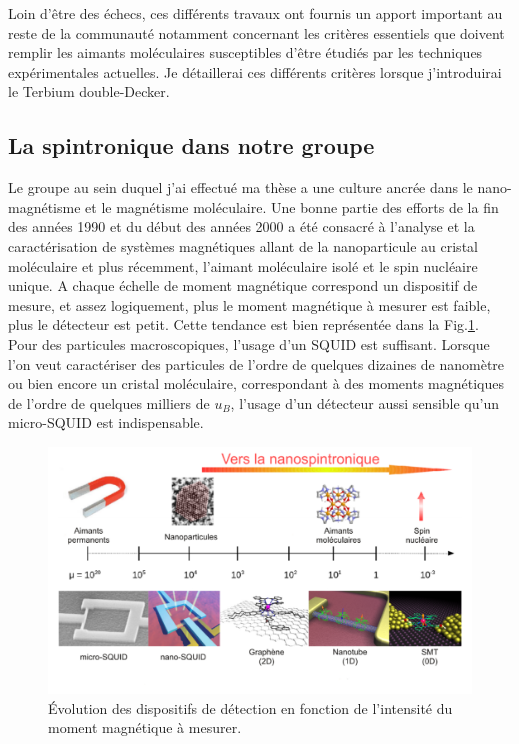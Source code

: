Loin d'\^etre des échecs, ces différents travaux ont fournis un apport important au reste de la communauté notamment concernant les critères essentiels que doivent remplir les aimants moléculaires susceptibles d'être étudiés par les techniques expérimentales actuelles. Je détaillerai ces différents critères lorsque j'introduirai le Terbium double-Decker.
 
\subsection{La spintronique dans notre groupe}
Le groupe au sein duquel j'ai effectué ma thèse a une culture ancrée dans le nano-magnétisme et le magnétisme moléculaire. Une bonne partie des efforts de la fin des années 1990 et du début des années 2000 a été consacré à l'analyse et la caractérisation de systèmes magnétiques allant de la nanoparticule au cristal moléculaire  et plus récemment, l'aimant moléculaire isolé et le spin nucléaire unique. A chaque échelle de moment magnétique correspond un dispositif de mesure, et assez logiquement, plus le moment magnétique à mesurer est faible, plus le détecteur est petit. Cette tendance est bien représentée dans la Fig.\ref{Group1}. Pour des particules macroscopiques, l'usage d'un SQUID est suffisant. Lorsque l'on veut caractériser des particules de l'ordre de quelques dizaines de nanomètre ou bien encore un cristal moléculaire, correspondant à des moments magnétiques de l'ordre de quelques milliers de $u_B$, l'usage d'un détecteur aussi sensible qu'un micro-SQUID est indispensable.


\begin{figure}
\centering \includegraphics[scale=0.45]{Spintronique/Group1/Group1.pdf}
\caption{\'Evolution des dispositifs de détection en fonction de l'intensité du moment magnétique à mesurer.}
\label{Group1}
\end{figure}



